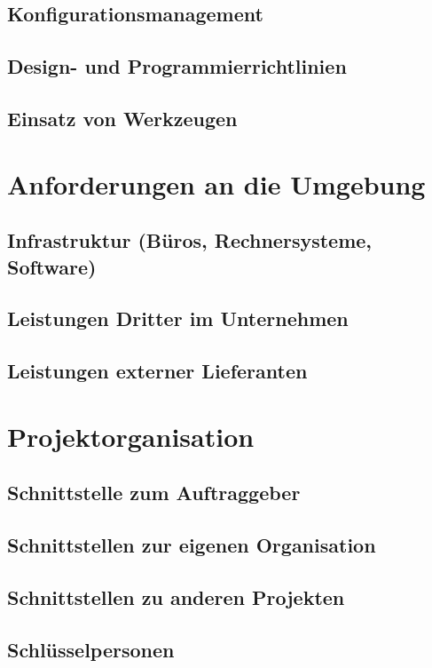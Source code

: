 \documentclass[a4paper,10pt]{scrartcl}
\begin{document}
\subsection{Konfigurationsmanagement}
\subsection{Design- und Programmierrichtlinien}
\subsection{Einsatz von Werkzeugen}



\section{Anforderungen an die Umgebung}
\subsection{Infrastruktur (Büros, Rechnersysteme, Software)}
\subsection{Leistungen Dritter im Unternehmen}
\subsection{Leistungen externer Lieferanten}




\section{Projektorganisation}
\subsection{Schnittstelle zum Auftraggeber}
\subsection{Schnittstellen zur eigenen Organisation}
\subsection{Schnittstellen zu anderen Projekten}
\subsection{Schlüsselpersonen}
\end{document}
